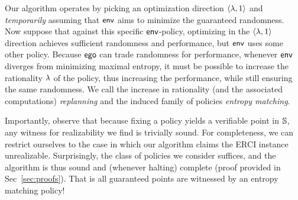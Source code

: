 Our algorithm operates by picking an optimization direction
$\langle \lambda, 1 \rangle$ and \emph{temporarily} assuming that $\mathsf{env}$
aims to minimize the guaranteed randomness.  Now suppose that against
this specific $\mathsf{env}$-policy, optimizing in the
$\langle \lambda, 1\rangle$ direction achieves sufficient randomness and
performance, but $\mathsf{env}$ uses some other policy. Because $\mathsf{ego}$ can
trade randomness for performance, whenever $\mathsf{env}$ diverges from
minimizing maximal entropy, it must be possible to increase the
rationality $\lambda$ of the policy, thus increasing the performance,
while still ensuring the same randomness. We call the increase in
rationality (and the associated computations) \emph{replanning} and
the induced family of policies \emph{entropy matching}.

Importantly, observe that because
fixing a policy yields a verifiable point in $\mathbb{S}$, any witness
for realizability we find is trivially sound. For completeness, we can
restrict ourselves to the case in which our algorithm claims the ERCI
instance unrealizable. Surprisingly, the class of policies we consider
suffices, and the algorithm is thus sound and (whenever halting)
complete (proof provided in Sec~\ref{sec:proofs}). That is all
guaranteed points are witnessed by an entropy matching policy!

